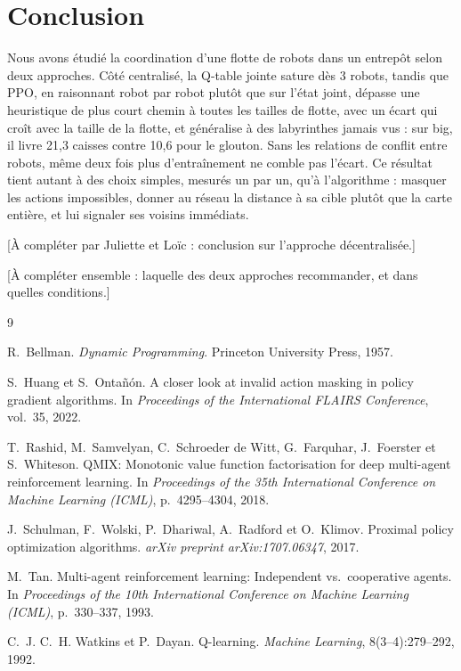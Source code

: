 \documentclass[11pt,a4paper]{article}
\begin{document}
\section{Conclusion}

Nous avons étudié la coordination d'une flotte de robots dans un entrepôt selon deux approches. Côté centralisé, la Q-table jointe sature dès 3 robots, tandis que PPO, en raisonnant robot par robot plutôt que sur l'état joint, dépasse une heuristique de plus court chemin à toutes les tailles de flotte, avec un écart qui croît avec la taille de la flotte, et généralise à des labyrinthes jamais vus : sur big, il livre 21,3 caisses contre 10,6 pour le glouton. Sans les relations de conflit entre robots, même deux fois plus d'entraînement ne comble pas l'écart. Ce résultat tient autant à des choix simples, mesurés un par un, qu'à l'algorithme : masquer les actions impossibles, donner au réseau la distance à sa cible plutôt que la carte entière, et lui signaler ses voisins immédiats.

[À compléter par Juliette et Loïc : conclusion sur l'approche décentralisée.]

[À compléter ensemble : laquelle des deux approches recommander, et dans quelles conditions.]

\begin{thebibliography}{9}

R.~Bellman.
\newblock \emph{Dynamic Programming}.
\newblock Princeton University Press, 1957.

S.~Huang et S.~Ontañón.
\newblock A closer look at invalid action masking in policy gradient algorithms.
\newblock In \emph{Proceedings of the International FLAIRS Conference}, vol.~35, 2022.

T.~Rashid, M.~Samvelyan, C.~Schroeder de Witt, G.~Farquhar, J.~Foerster et S.~Whiteson.
\newblock QMIX: Monotonic value function factorisation for deep multi-agent reinforcement learning.
\newblock In \emph{Proceedings of the 35th International Conference on Machine Learning (ICML)}, p.~4295--4304, 2018.

J.~Schulman, F.~Wolski, P.~Dhariwal, A.~Radford et O.~Klimov.
\newblock Proximal policy optimization algorithms.
\newblock \emph{arXiv preprint arXiv:1707.06347}, 2017.

M.~Tan.
\newblock Multi-agent reinforcement learning: Independent vs.\ cooperative agents.
\newblock In \emph{Proceedings of the 10th International Conference on Machine Learning (ICML)}, p.~330--337, 1993.

C.~J. C.~H. Watkins et P.~Dayan.
\newblock Q-learning.
\newblock \emph{Machine Learning}, 8(3--4):279--292, 1992.

\end{thebibliography}
\end{document}
